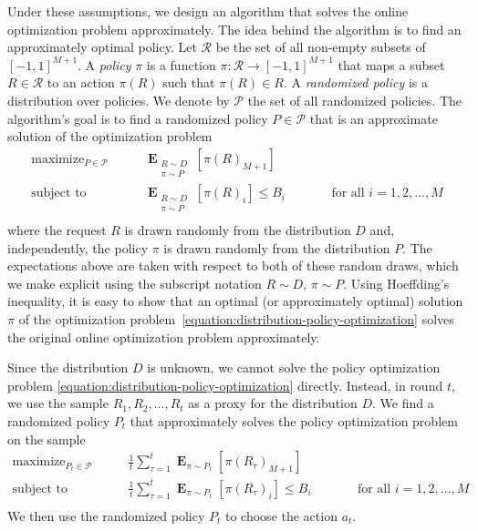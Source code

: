 \documentclass[12pt]{article}
\newcommand{\Requests}{\mathcal{R}}
\renewcommand{\P}{\mathcal{P}}
\DeclareMathOperator*{\Exp}{\mathbf{E}}
\DeclareMathOperator*{\maximize}{maximize}
\DeclareMathOperator*{\subjectto}{subject\ to}
\theoremstyle{definition}
\begin{document}
Under these assumptions, we design an algorithm that solves the online
optimization problem approximately. The idea behind the algorithm is to find an
approximately optimal policy. Let $\Requests$ be the set of all non-empty
subsets of $[-1,1]^{M+1}$. A \emph{policy} $\pi$ is a function $\pi:\Requests
\to [-1,1]^{M+1}$ that maps a subset $R \in \Requests$ to an action $\pi(R)$
such that $\pi(R) \in R$. A \emph{randomized policy} is a distribution over policies.
We denote by $\P$ the set of all randomized policies. The algorithm's goal is to
find a randomized policy $P \in \P$ that is an approximate solution of the
optimization problem
\begin{equation}
\label{equation:distribution-policy-optimization}
\begin{aligned}
\maximize_{P \in \P} \qquad & \Exp_{\substack{R \sim D \\ \pi \sim P}} \left[ \pi(R)_{M+1} \right] \\
\subjectto \qquad & \Exp_{\substack{R \sim D \\ \pi \sim P}} \left[ \pi(R)_i \right] \le B_i && \qquad \text{for all $i=1,2,\dots,M$} \\
\end{aligned}
\end{equation}
where the request $R$ is drawn randomly from the distribution $D$ and,
independently, the policy $\pi$ is drawn randomly from the distribution $P$. The
expectations above are taken with respect to both of these random draws, which
we make explicit using the subscript notation $R \sim D$, $\pi \sim P$. Using
Hoeffding's inequality, it is easy to show that an optimal (or approximately
optimal) solution $\pi$ of the optimization
problem~\eqref{equation:distribution-policy-optimization} solves the original
online optimization problem approximately.

Since the distribution $D$ is unknown, we cannot solve the policy optimization
problem \eqref{equation:distribution-policy-optimization} directly. Instead, in
round $t$, we use the sample $R_1, R_2, \dots, R_t$ as a proxy for the
distribution $D$. We find a randomized policy $P_t$ that approximately solves
the policy optimization problem on the sample
\begin{equation}
\label{equation:sample-policy-optimization}
\begin{aligned}
\maximize_{P_t \in \P} \qquad & \frac{1}{t} \sum_{\tau=1}^t \Exp_{\pi \sim P_t} \left[ \pi(R_\tau)_{M+1} \right] \\
\subjectto \qquad & \frac{1}{t} \sum_{\tau=1}^t \Exp_{\pi \sim P_t} \left[ \pi(R_\tau)_i \right] \le B_i && \qquad \text{for all $i=1,2,\dots,M$} \\
\end{aligned}
\end{equation}
We then use the randomized policy $P_t$ to choose the action $a_t$.
\end{document}
